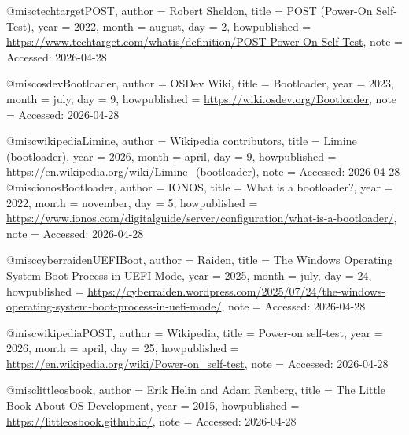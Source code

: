 
@misc{techtargetPOST,
  author       = {Robert Sheldon},
  title        = {{POST (Power-On Self-Test)}},
  year         = {2022},
  month        = {august},
  day          = {2}, 
  howpublished = {\url{https://www.techtarget.com/whatis/definition/POST-Power-On-Self-Test}},
  note         = {Accessed: 2026-04-28}
}

@misc{osdevBootloader,
  author       = {{OSDev Wiki}},
  title        = {{Bootloader}},
  year         = {2023},
  month        = {july},
  day          = {9},
  howpublished = {\url{https://wiki.osdev.org/Bootloader}},
  note         = {Accessed: 2026-04-28}
}

@misc{wikipediaLimine,
  author       = {{Wikipedia contributors}},
  title        = {{Limine (bootloader)}},
  year         = {2026},
  month        = {april},
  day          = {9},
  howpublished = {\url{https://en.wikipedia.org/wiki/Limine_(bootloader)}},
  note         = {Accessed: 2026-04-28}
}
@misc{ionosBootloader,
  author       = {{IONOS}},
  title        = {{What is a bootloader?}},
  year         = {2022},
  month        = {november},
  day          = {5},
  howpublished = {\url{https://www.ionos.com/digitalguide/server/configuration/what-is-a-bootloader/}},
  note         = {Accessed: 2026-04-28}
}

@misc{cyberraidenUEFIBoot,
  author       = {{Raiden}},
  title        = {{The Windows Operating System Boot Process in UEFI Mode}},
  year         = {2025},
  month        = {july},
  day          = {24},
  howpublished = {\url{https://cyberraiden.wordpress.com/2025/07/24/the-windows-operating-system-boot-process-in-uefi-mode/}},
  note         = {Accessed: 2026-04-28}
}

@misc{wikipediaPOST,
  author       = {{Wikipedia}},
  title        = {{Power-on self-test}},
  year         = {2026},
  month        = {april},
  day          = {25},
  howpublished = {\url{https://en.wikipedia.org/wiki/Power-on_self-test}},
  note         = {Accessed: 2026-04-28}
}

@misc{littleosbook,
  author       = {Erik Helin and Adam Renberg},
  title        = {The Little Book About OS Development},
  year         = {2015},
  howpublished = {\url{https://littleosbook.github.io/}},
  note         = {Accessed: 2026-04-28}
}


